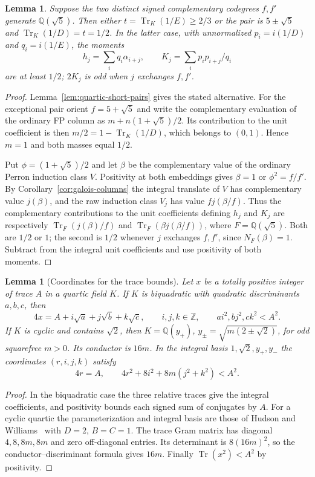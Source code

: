 \documentclass[11pt,reqno]{amsart}
\newtheorem{lemma}[theorem]{Lemma}
\theoremstyle{remark}\newtheorem{remark}[theorem]{Remark}
\numberwithin{equation}{section}
\begin{document}
\begin{lemma}\label{thm:quartic-five-to-three}
Suppose the two distinct signed complementary codegrees $f,f'$ generate
$\mathbb Q(\sqrt5)$. Then either $t=\operatorname{Tr}_K(1/E)\ge2/3$
or the pair is $5\pm\sqrt5$ and
$\operatorname{Tr}_K(1/D)=t=1/2$. In the latter case, with unnormalized
$p_i=i(1/D)$ and $q_i=i(1/E)$, the moments
\[
 h_j=\sum_i q_i\alpha_{i+j},\qquad
 K_j=\sum_i p_i p_{i+j}/q_i
\]
are at least $1/2$; $2K_j$ is odd when $j$ exchanges $f,f'$.
\end{lemma}
\begin{proof}
Lemma~\ref{lem:quartic-short-pairs} gives the stated alternative.
For the exceptional pair orient
$f=5+\sqrt5$ and write the complementary evaluation of the ordinary
FP column as $m+n(1+\sqrt5)/2$. Its contribution to the unit
coefficient is then $m/2=1-\operatorname{Tr}_K(1/D)$, which belongs
to $(0,1)$. Hence $m=1$ and both masses equal $1/2$.

Put $\phi=(1+\sqrt5)/2$ and let $\beta$ be the complementary value
of the ordinary Perron induction class $V$. Positivity at both
embeddings gives $\beta=1$ or $\phi^2=f/f'$. By
Corollary~\ref{cor:galois-columns} the integral translate of $V$ has
complementary value $j(\beta)$, and the raw induction class $V_j$
has value $f j(\beta/f)$. Thus the complementary contributions to
the unit coefficients defining $h_j$ and $K_j$ are respectively
$\operatorname{Tr}_F(j(\beta)/f)$ and
$\operatorname{Tr}_F(\beta j(\beta/f))$, where $F=\mathbb Q(\sqrt5)$.
Both are $1/2$ or $1$; the second is $1/2$ whenever $j$ exchanges
$f,f'$, since $N_F(\beta)=1$. Subtract from the integral unit
coefficients and use positivity of both moments.
\end{proof}

\begin{lemma}[Coordinates for the trace bounds]\label{lem:quartic-trace-box}
Let $x$ be a totally positive integer of trace $A$ in a quartic field $K$.
If $K$ is biquadratic with quadratic discriminants $a,b,c$, then
\[
 4x=A+i\sqrt a+j\sqrt b+k\sqrt c,\qquad
 i,j,k\in\mathbb Z,\qquad ai^2,bj^2,ck^2<A^2.
\]
If $K$ is cyclic and contains $\sqrt2$, then
$K=\mathbb Q(y_+)$, $y_\pm=\sqrt{m(2\pm\sqrt2)}$, for odd
squarefree $m>0$. Its conductor is $16m$. In the integral basis
$1,\sqrt2,y_+,y_-$ the coordinates $(r,i,j,k)$ satisfy
\[
       4r=A,\qquad 4r^2+8i^2+8m(j^2+k^2)<A^2 .
\]
\end{lemma}
\begin{proof}
In the biquadratic case the three relative traces give the integral
coefficients, and positivity bounds each signed sum of conjugates by
$A$. For a cyclic quartic the parameterization and integral basis are
those of Hudson and Williams~\cite[pp.~145--146, Theorem~(i)]{HudsonWilliams}
with $D=2$, $B=C=1$. The trace Gram matrix has diagonal $4,8,8m,8m$
and zero off-diagonal entries. Its determinant is $8(16m)^2$, so the
conductor--discriminant formula gives $16m$. Finally
$\operatorname{Tr}(x^2)<A^2$ by positivity.
\end{proof}
\end{document}
